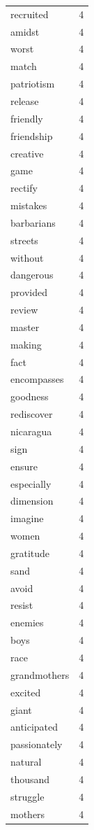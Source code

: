 \begin{tabular}{lr}
recruited & 4 \\
amidst & 4 \\
worst & 4 \\
match & 4 \\
patriotism & 4 \\
release & 4 \\
friendly & 4 \\
friendship & 4 \\
creative & 4 \\
game & 4 \\
rectify & 4 \\
mistakes & 4 \\
barbarians & 4 \\
streets & 4 \\
without & 4 \\
dangerous & 4 \\
provided & 4 \\
review & 4 \\
master & 4 \\
making & 4 \\
fact & 4 \\
encompasses & 4 \\
goodness & 4 \\
rediscover & 4 \\
nicaragua & 4 \\
sign & 4 \\
ensure & 4 \\
especially & 4 \\
dimension & 4 \\
imagine & 4 \\
women & 4 \\
gratitude & 4 \\
sand & 4 \\
avoid & 4 \\
resist & 4 \\
enemies & 4 \\
boys & 4 \\
race & 4 \\
grandmothers & 4 \\
excited & 4 \\
giant & 4 \\
anticipated & 4 \\
passionately & 4 \\
natural & 4 \\
thousand & 4 \\
struggle & 4 \\
mothers & 4 \\

\end{tabular}
